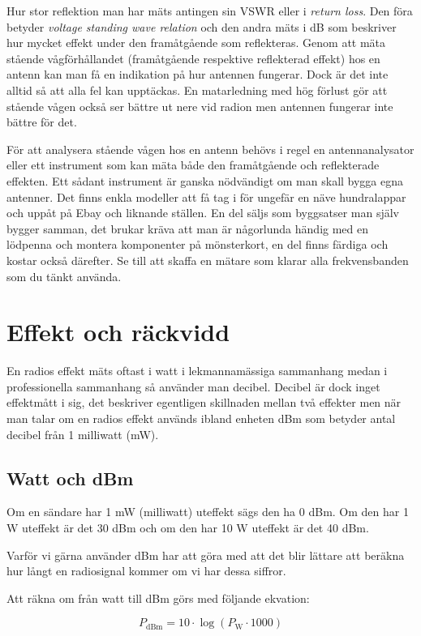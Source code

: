 Hur stor reflektion man har mäts antingen sin VSWR eller i \textit{return loss}. Den föra betyder \textit{voltage standing wave relation} och den andra mäts i dB som beskriver hur mycket effekt under den framåtgående som reflekteras. Genom att mäta stående vågförhållandet (framåtgående respektive reflekterad effekt) hos en antenn kan man få en indikation på hur antennen fungerar. Dock är det inte alltid så att alla fel kan upptäckas. En matarledning med hög förlust gör att stående vågen också ser bättre ut nere vid radion men antennen fungerar inte bättre för det. 

För att analysera stående vågen hos en antenn behövs i regel en antennanalysator eller ett instrument som kan mäta både den framåtgående och reflekterade effekten. Ett sådant instrument är ganska nödvändigt om man skall bygga egna antenner. Det finns enkla modeller att få tag i för ungefär en näve hundralappar och uppåt på Ebay och liknande ställen. En del säljs som byggsatser man själv bygger samman, det brukar kräva att man är någorlunda händig med en lödpenna och montera komponenter på mönsterkort, en del finns färdiga och kostar också därefter. Se till att skaffa en mätare som klarar alla frekvensbanden som du tänkt använda.

\section{Effekt och räckvidd}

En radios effekt mäts oftast i watt i lekmannamässiga sammanhang medan i professionella sammanhang så använder man decibel. Decibel är dock inget effektmått i sig, det beskriver egentligen skillnaden mellan två effekter men när man talar om en radios effekt används ibland enheten dBm som betyder antal decibel från 1 milliwatt (mW).

\subsection{Watt och dBm}

Om en sändare har 1 mW (milliwatt) uteffekt sägs den ha 0 dBm. Om den har 1 W uteffekt är det 30 dBm och om den har 10 W uteffekt är det 40 dBm.

Varför vi gärna använder dBm har att göra med att det blir lättare att beräkna hur långt en radiosignal kommer om vi har dessa siffror. 

Att räkna om från watt till dBm görs med följande ekvation:

\begin{equation}
P_{\mathrm{dBm}}=10\cdot\log(P_{\mathrm{W}}\cdot 1000)
\end{equation}

